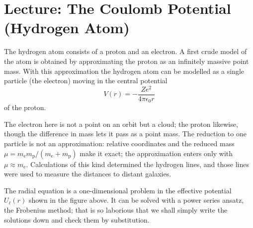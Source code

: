 
\section{Lecture: The Coulomb Potential (Hydrogen Atom)}



The hydrogen atom consists of a proton and an electron. A first crude model of the atom is obtained by approximating the proton as an infinitely massive point mass. With this approximation the hydrogen atom can be modelled as a single particle (the electron) moving in the central potential 
\begin{equation}
	V(r) = -\frac{Ze^2}{4\pi \epsilon_0 r}
\end{equation}
of the proton.

The electron here is not a point on an orbit but a cloud; the proton likewise,
though the difference in mass lets it pass as a point mass. The reduction to one
particle is not an approximation: relative coordinates and the reduced mass
$\mu = m_{\text{e}}m_{\text{p}}/(m_{\text{e}}+m_{\text{p}})$ make it exact; the
approximation enters only with $\mu \approx m_{\text{e}}$. Calculations of this
kind determined the hydrogen lines, and those lines were used to measure the
distances to distant galaxies.

The radial equation is a one-dimensional problem in the effective potential
$U_\ell(r)$ shown in the figure above. It can be solved with a power series ansatz,
the Frobenius method; that is so laborious that we shall simply write the solutions
down and check them by substitution.

